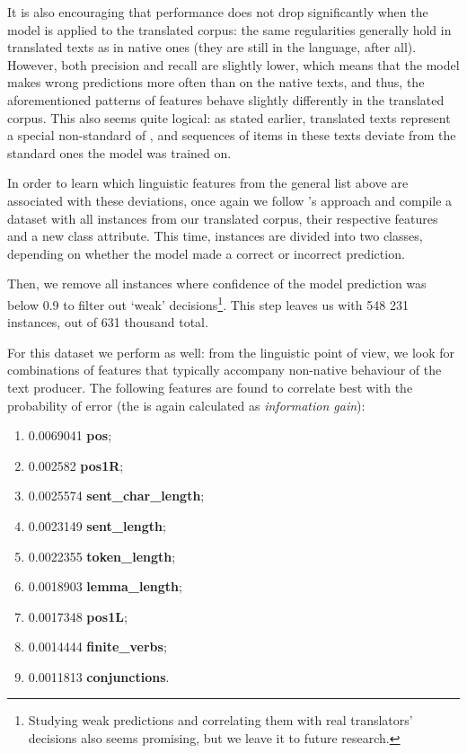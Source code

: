 \documentclass[output=paper]{langsci/langscibook.cls}
\begin{document}
It is also encouraging that performance does not drop significantly when the model is applied to the translated corpus: the same regularities generally hold in translated texts as in native ones (they are still in the  language, after all). However, both precision and recall are slightly lower, which means that the model makes wrong predictions more often than on the native texts, and thus, the aforementioned patterns of features behave slightly differently in the translated corpus. This also seems quite logical: as stated earlier, translated texts represent a special non-standard  of , and sequences of items in these texts deviate from the standard ones the model was trained on. 

In order to learn which linguistic features from the general list above are associated with these deviations, once again we follow \citet{Gries:2014}'s approach and compile a dataset with all instances from our translated corpus, their respective features and a new class attribute. This time, instances are divided into two classes, depending on whether the model made a correct or incorrect prediction. 

Then, we remove all instances where confidence of the model prediction was below 0.9 to filter out `weak' decisions\footnote{Studying weak predictions and correlating them with real translators' decisions also seems promising, but we leave it to future research.}. This step leaves us with 548 231 instances, out of 631 thousand total.

For this dataset we perform  as well: from the linguistic point of view, we look for combinations of features that typically accompany non-native behaviour of the text producer. The following features are found to correlate best with the probability of error (the  is again calculated as \textit{information gain}):

\begin{enumerate}
\item 0.0069041 \textbf{pos};
\item 0.002582  \textbf{pos1R};
\item 0.0025574 \textbf{sent\_char\_length};
\item 0.0023149 \textbf{sent\_length};
\item 0.0022355 \textbf{token\_length};
\item 0.0018903 \textbf{lemma\_length};
\item 0.0017348 \textbf{pos1L};
\item 0.0014444 \textbf{finite\_verbs};
\item 0.0011813 \textbf{conjunctions}.
\end{enumerate}
\end{document}

